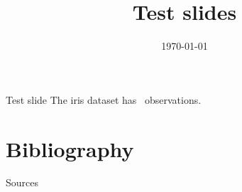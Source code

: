 

\title{Test slides}
\subtitle{}
\author{}
\institute{}
\date{\today}







\begin{frame}
    \titlepage
\end{frame}


\begin{frame}{Test slide}
  The iris dataset has \irisobs~observations.
\end{frame}


\appendix
\begingroup

\section{Bibliography}
\begin{frame}[allowframebreaks]{Sources}
  \printbibliography[heading=none]
\end{frame}



